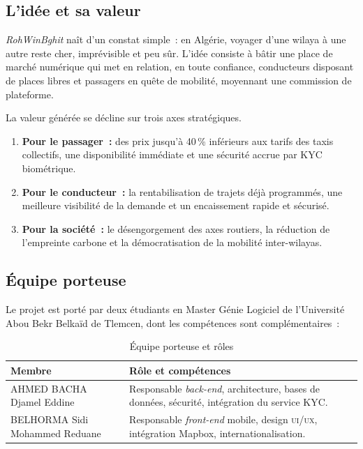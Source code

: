 \subsection{L'idée et sa valeur}

\textit{RohWinBghit} naît d'un constat simple~: en Algérie, voyager d'une wilaya à une autre reste cher, imprévisible et peu sûr. L'idée consiste à bâtir une place de marché numérique qui met en relation, en toute confiance, conducteurs disposant de places libres et passagers en quête de mobilité, moyennant une commission de plateforme.

La valeur générée se décline sur trois axes stratégiques.
\begin{enumerate}
  \item \textbf{Pour le passager~:} des prix jusqu'à 40\,\% inférieurs aux tarifs des taxis collectifs, une disponibilité immédiate et une sécurité accrue par KYC biométrique.
  \item \textbf{Pour le conducteur~:} la rentabilisation de trajets déjà programmés, une meilleure visibilité de la demande et un encaissement rapide et sécurisé.
  \item \textbf{Pour la société~:} le désengorgement des axes routiers, la réduction de l'empreinte carbone et la démocratisation de la mobilité inter-wilayas.
\end{enumerate}

\subsection{Équipe porteuse}

Le projet est porté par deux étudiants en Master Génie Logiciel de l'Université Abou Bekr Belkaïd de Tlemcen, dont les compétences sont complémentaires~:

\begin{table}[H]
\centering
\begin{tabularx}{\textwidth}{|l|X|}
\hline
\rowcolor{rohlight}
\textbf{Membre} & \textbf{Rôle et compétences} \\
\hline
AHMED BACHA Djamel Eddine & Responsable \textit{back-end}, architecture, bases de données, sécurité, intégration du service KYC. \\
\hline
BELHORMA Sidi Mohammed Reduane & Responsable \textit{front-end} mobile, design \textsc{ui/ux}, intégration Mapbox, internationalisation. \\
\hline
\end{tabularx}
  \caption{Équipe porteuse et rôles}
\end{table}

